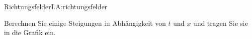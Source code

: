 \begin{LA}{Richtungsfelder}{LA:richtungsfelder}

    Berechnen Sie einige Steigungen in Abhängigkeit von \(t\)
    und \(x\) und tragen Sie sie in die Grafik ein.












\end{LA}

